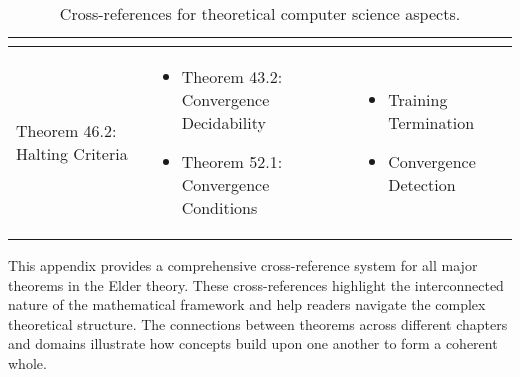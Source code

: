 \begin{table}[h]
\begin{tabular}{|l|p{7cm}|p{4cm}|}
\begin{itemize}
\end{itemize} \\
\hline
Theorem 46.2: Halting Criteria &
\begin{itemize}
    \item Theorem 43.2: Convergence Decidability
    \item Theorem 52.1: Convergence Conditions
\end{itemize} &
\begin{itemize}
    \item Training Termination
    \item Convergence Detection
\end{itemize} \\
\hline
\end{tabular}
\caption{Cross-references for theoretical computer science aspects.}
\label{tab:xref_cs}
\end{table}

This appendix provides a comprehensive cross-reference system for all major theorems in the Elder theory. These cross-references highlight the interconnected nature of the mathematical framework and help readers navigate the complex theoretical structure. The connections between theorems across different chapters and domains illustrate how concepts build upon one another to form a coherent whole.